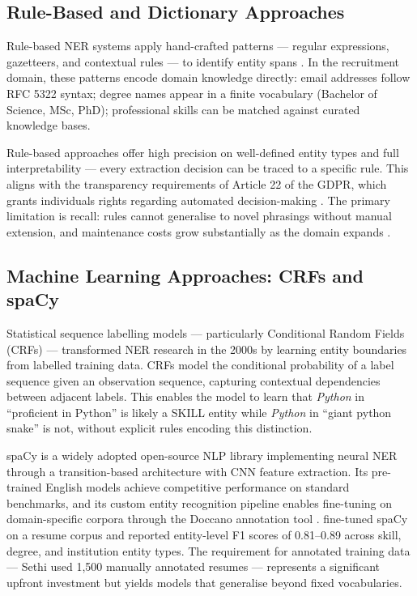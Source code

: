 \subsection{Rule-Based and Dictionary Approaches}

Rule-based NER systems apply hand-crafted patterns --- regular expressions, gazetteers, and contextual rules --- to identify entity spans \citep{Chiticariu2013}. In the recruitment domain, these patterns encode domain knowledge directly: email addresses follow RFC 5322 syntax; degree names appear in a finite vocabulary (Bachelor of Science, MSc, PhD); professional skills can be matched against curated knowledge bases.

Rule-based approaches offer high precision on well-defined entity types and full interpretability --- every extraction decision can be traced to a specific rule. This aligns with the transparency requirements of Article 22 of the GDPR, which grants individuals rights regarding automated decision-making \citep{GDPR2016}. The primary limitation is recall: rules cannot generalise to novel phrasings without manual extension, and maintenance costs grow substantially as the domain expands \citep{Chiticariu2013}.

\subsection{Machine Learning Approaches: CRFs and spaCy}

Statistical sequence labelling models --- particularly Conditional Random Fields (CRFs) \citep{Lafferty2001} --- transformed NER research in the 2000s by learning entity boundaries from labelled training data. CRFs model the conditional probability of a label sequence given an observation sequence, capturing contextual dependencies between adjacent labels. This enables the model to learn that \textit{Python} in ``proficient in Python'' is likely a SKILL entity while \textit{Python} in ``giant python snake'' is not, without explicit rules encoding this distinction.

spaCy \citep{spacy2020} is a widely adopted open-source NLP library implementing neural NER through a transition-based architecture with CNN feature extraction. Its pre-trained English models achieve competitive performance on standard benchmarks, and its custom entity recognition pipeline enables fine-tuning on domain-specific corpora through the Doccano annotation tool \citep{Nakayama2018}. \citet{Sethi2021} fine-tuned spaCy on a resume corpus and reported entity-level F1 scores of 0.81--0.89 across skill, degree, and institution entity types. The requirement for annotated training data --- Sethi used 1,500 manually annotated resumes --- represents a significant upfront investment but yields models that generalise beyond fixed vocabularies.

